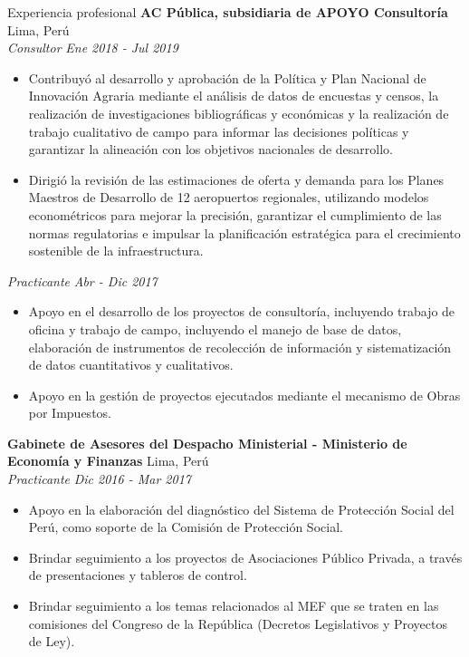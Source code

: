 \documentclass{resume} %
\begin{document}
\begin{rSection}{Experiencia profesional}
    \textbf{AC Pública, subsidiaria de APOYO Consultoría} \hfill Lima, Perú\\
    \textit{Consultor} \hfill \textit{Ene 2018 - Jul 2019}
     \begin{itemize}
        \itemsep -3pt {} 
         \item Contribuyó al desarrollo y aprobación de la Política y Plan Nacional de Innovación Agraria mediante el análisis de datos de encuestas y censos, la realización de investigaciones bibliográficas y económicas y la realización de trabajo cualitativo de campo para informar las decisiones políticas y garantizar la alineación con los objetivos nacionales de desarrollo.
         \item Dirigió la revisión de las estimaciones de oferta y demanda para los Planes Maestros de Desarrollo de 12 aeropuertos regionales, utilizando modelos econométricos para mejorar la precisión, garantizar el cumplimiento de las normas regulatorias e impulsar la planificación estratégica para el crecimiento sostenible de la infraestructura.
     \end{itemize}

     \textit{Practicante} \hfill \textit{Abr - Dic 2017}
     \begin{itemize}
        \itemsep -3pt {} 
         \item Apoyo en el desarrollo de los proyectos de consultoría, incluyendo trabajo de oficina y trabajo de campo, incluyendo el manejo de base de datos, elaboración de instrumentos de recolección de información y sistematización de datos cuantitativos y cualitativos.
         \item Apoyo en la gestión de proyectos ejecutados mediante el mecanismo de Obras por Impuestos.
     \end{itemize}

    \textbf{Gabinete de Asesores del Despacho Ministerial - Ministerio de Economía y Finanzas} \hfill Lima, Perú\\
    \textit{Practicante} \hfill \textit{Dic 2016 - Mar 2017}
    \begin{itemize}
        \itemsep -3pt {} 
        \item Apoyo en la elaboración del diagnóstico del Sistema de Protección Social del Perú, como soporte de la Comisión de Protección Social.
        \item Brindar seguimiento a los proyectos de Asociaciones Público Privada, a través de presentaciones y tableros de control.
        \item Brindar seguimiento a los temas relacionados al MEF que se traten en las comisiones del Congreso de la República (Decretos Legislativos y Proyectos de Ley).
    \end{itemize}


\end{rSection}
\end{document}
